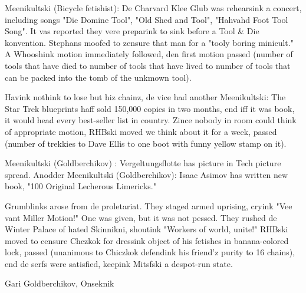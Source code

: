 \documentclass[12pt]{article}
\begin{document}
Meenikultski (Bicycle fetishist): De Charvard Klee Glub was rehearsink a concert, including songs "Die Domine Tool", "Old Shed and Tool", "Hahvahd Foot Tool Song". It vas reported they vere preparink to sink before a Tool & Die konvention. Stephans moofed to zensure that man for a "tooly boring minicult." A Whooshink motion immediately followed, den first motion passed (number of tools that have died to number of tools that have lived to number of tools that can be packed into the tomb of the unkmown tool).

Havink nothink to lose but hiz chainz, de vice had another Meenikultski: The Star Trek blueprints haff sold 150,000 copies in two months, end iff it was book, it would head every best-seller list in country. Zince nobody in room could think of appropriate motion, RHBski moved we think about it for a week, passed (number of trekkies to Dave Ellis to one boot with funny yellow stamp on it).

Meenikultski (Goldberchikov) : Vergeltungsflotte has picture in Tech picture spread. Anodder Meenikultski (Goldberchikov): Isaac Asimov has written new book, "100 Original Lecherous Limericks."

Grumblinks arose from de proletariat. They staged armed uprising, cryink "Vee vant Miller Motion!" One was given, but it was not pessed. They rushed de Winter Palace of hated Skinnikni, shoutink "Workers of world, unite!" RHBski moved to censure Chczkok for dressink object of his fetishes in banana-colored lock, passed (unanimous to Chiczkok defendink his friend'z purity to 16 chains), end de serfs were satisfied, keepink Mitsfski a despot-run state.

\vspace{12pt}

\centerline{Gari Goldberchikov, Onseknik}
\end{document}
